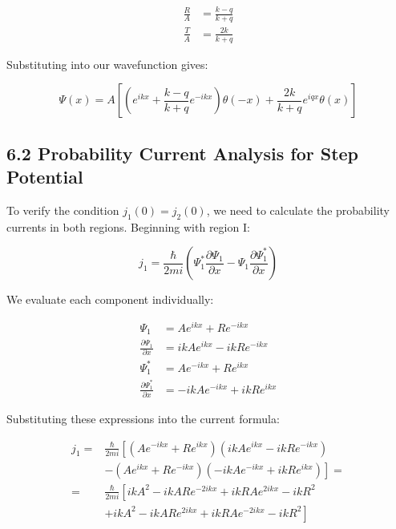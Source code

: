 \documentclass[10pt]{article}
\begin{document}
\begin{align*}
\frac{R}{A} & =\frac{k-q}{k+q} \\
\frac{T}{A} & =\frac{2 k}{k+q} \tag{6.17}
\end{align*}

Substituting into our wavefunction gives:

\begin{equation*}
\Psi(x)=A\left[\left(e^{i k x}+\frac{k-q}{k+q} e^{-i k x}\right) \theta(-x)+\frac{2 k}{k+q} e^{i q x} \theta(x)\right] \tag{6.18}
\end{equation*}


\subsection*{6.2 Probability Current Analysis for Step Potential}

To verify the condition $j_{1}(0)=j_{2}(0)$, we need to calculate the probability currents in both regions. Beginning with region I:

\begin{equation*}
j_{1}=\frac{\hbar}{2 m i}\left(\Psi_{1}^{*} \frac{\partial \Psi_{1}}{\partial x}-\Psi_{1} \frac{\partial \Psi_{1}^{*}}{\partial x}\right) \tag{6.19}
\end{equation*}

We evaluate each component individually:

\begin{align*}
\Psi_{1} & =A e^{i k x}+R e^{-i k x} \\
\frac{\partial \Psi_{1}}{\partial x} & =i k A e^{i k x}-i k R e^{-i k x} \\
\Psi_{1}^{*} & =A e^{-i k x}+R e^{i k x}  \tag{6.20}\\
\frac{\partial \Psi_{1}^{*}}{\partial x} & =-i k A e^{-i k x}+i k R e^{i k x}
\end{align*}

Substituting these expressions into the current formula:

\begin{align*}
j_{1}= & \frac{\hbar}{2 m i}\left[\left(A e^{-i k x}+R e^{i k x}\right)\left(i k A e^{i k x}-i k R e^{-i k x}\right)\right. \\
& \left.-\left(A e^{i k x}+R e^{-i k x}\right)\left(-i k A e^{-i k x}+i k R e^{i k x}\right)\right]= \\
= & \frac{\hbar}{2 m i}\left[i k A^{2}-i k A R e^{-2 i k x}+i k R A e^{2 i k x}-i k R^{2}\right.  \tag{6.21}\\
& \left.+i k A^{2}-i k A R e^{2 i k x}+i k R A e^{-2 i k x}-i k R^{2}\right]
\end{align*}
\end{document}
